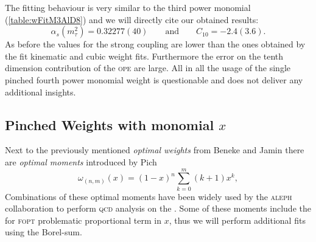 \documentclass[../../index.tex]{subfiles}
\begin{document}
The fitting behaviour is very similar to the third power monomial
(\cref{table:wFitM3AlD8}) and we will directly cite our obtained results:
\begin{equation}
  \alpha_s(m_\tau^2) = 0.32277(40) \qquad \text{and} \qquad C_{10}=-2.4(3.6).
\end{equation}
As before the values for the strong coupling are lower than the ones obtained by
the fit kinematic and cubic weight fits. Furthermore the error on the tenth dimension
contribution of the \textsc{ope} are large. All in all the usage of the single pinched
fourth power monomial weight is questionable and does not deliver any additional
insights.


\subsection{Pinched Weights with monomial \(x\)}
Next to the previously mentioned \textit{optimal weights} from Beneke and Jamin
\cite{Beneke2012} there are \textit{optimal moments} introduced by Pich
\cite{LeDiberder1992}
\begin{equation}
  \omega_{(n,m)}(x) = (1-x)^n\sum_{k=0}^m (k+1)x^k,
\end{equation}
Combinations of these optimal moments have been widely used by the
\textsc{aleph} collaboration to perform \textsc{qcd} analysis on the
. Some of these moments include
the for \textsc{fopt} problematic proportional term in \(x\), thus we will
perform additional fits using the Borel-sum.
\end{document}
